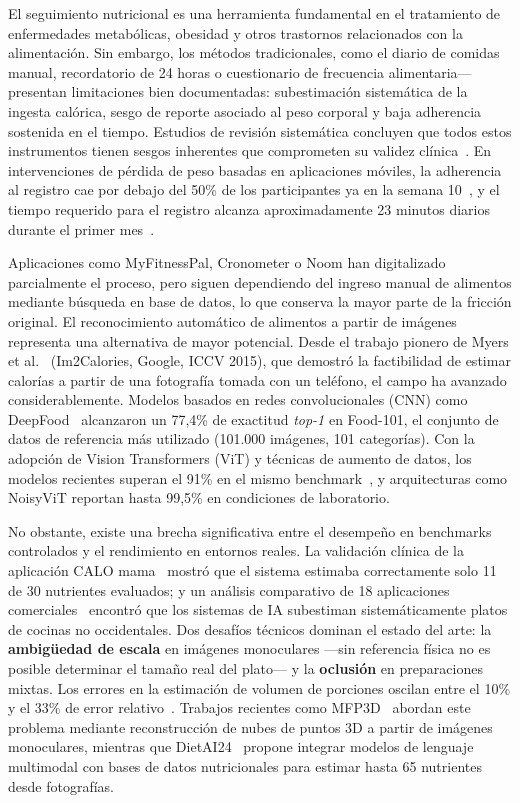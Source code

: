 \documentclass[
11pt, %
]{charter}
\begin{document}
El seguimiento nutricional es una herramienta fundamental en el tratamiento de enfermedades metabólicas, obesidad y otros trastornos relacionados con la alimentación. Sin embargo, los métodos tradicionales, como el diario de comidas manual, recordatorio de 24 horas o cuestionario de frecuencia alimentaria— presentan limitaciones bien documentadas: subestimación sistemática de la ingesta calórica, sesgo de reporte asociado al peso corporal y baja adherencia sostenida en el tiempo. Estudios de revisión sistemática concluyen que todos estos instrumentos tienen sesgos inherentes que comprometen su validez clínica~\cite{dahl2020traditional}. En intervenciones de pérdida de peso basadas en aplicaciones móviles, la adherencia al registro cae por debajo del 50\% de los participantes ya en la semana 10~\cite{lyzwinski2019adherence}, y el tiempo requerido para el registro alcanza aproximadamente 23 minutos diarios durante el primer mes~\cite{vitale2022burden}.

Aplicaciones como MyFitnessPal, Cronometer o Noom han digitalizado parcialmente el proceso, pero siguen dependiendo del ingreso manual de alimentos mediante búsqueda en base de datos, lo que conserva la mayor parte de la fricción original. El reconocimiento automático de alimentos a partir de imágenes representa una alternativa de mayor potencial. Desde el trabajo pionero de Myers et al.~\cite{myers2015im2calories} (Im2Calories, Google, ICCV 2015), que demostró la factibilidad de estimar calorías a partir de una fotografía tomada con un teléfono, el campo ha avanzado considerablemente. Modelos basados en redes convolucionales (CNN) como DeepFood~\cite{liu2016deepfood} alcanzaron un 77,4\% de exactitud \textit{top-1} en Food-101, el conjunto de datos de referencia más utilizado (101.000 imágenes, 101 categorías). Con la adopción de Vision Transformers (ViT) y técnicas de aumento de datos, los modelos recientes superan el 91\% en el mismo benchmark~\cite{mdpi2025review}, y arquitecturas como NoisyViT reportan hasta 99,5\% en condiciones de laboratorio.

No obstante, existe una brecha significativa entre el desempeño en benchmarks controlados y el rendimiento en entornos reales. La validación clínica de la aplicación CALO mama~\cite{nakamura2022calomama} mostró que el sistema estimaba correctamente solo 11 de 30 nutrientes evaluados; y un análisis comparativo de 18 aplicaciones comerciales~\cite{nutrients2024review} encontró que los sistemas de IA subestiman sistemáticamente platos de cocinas no occidentales. Dos desafíos técnicos dominan el estado del arte: la \textbf{ambigüedad de escala} en imágenes monoculares —sin referencia física no es posible determinar el tamaño real del plato— y la \textbf{oclusión} en preparaciones mixtas. Los errores en la estimación de volumen de porciones oscilan entre el 10\% y el 33\% de error relativo~\cite{martinezgarcia2023}. Trabajos recientes como MFP3D~\cite{mfp3d2024} abordan este problema mediante reconstrucción de nubes de puntos 3D a partir de imágenes monoculares, mientras que DietAI24~\cite{dietai24_2025} propone integrar modelos de lenguaje multimodal con bases de datos nutricionales para estimar hasta 65 nutrientes desde fotografías.
\end{document}
